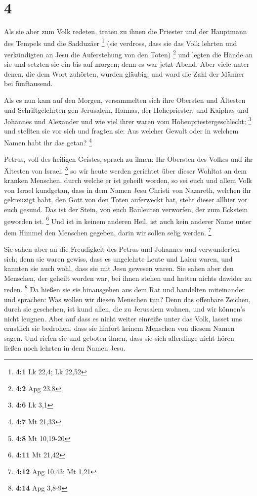 \hypertarget{section-1}{%
\section{4}\label{section-1}}

 Als sie aber zum Volk redeten, traten zu ihnen die
Priester und der Hauptmann des Tempels und die Sadduzäer \footnote{\textbf{4:1}
  Lk 22,4; Lk 22,52}  (sie verdross, dass sie das Volk
lehrten und verkündigten an Jesu die Auferstehung von den Toten)
\footnote{\textbf{4:2} Apg 23,8}  und legten die Hände an
sie und setzten sie ein bis auf morgen; denn es war jetzt Abend.
 Aber viele unter denen, die dem Wort zuhörten, wurden
gläubig; und ward die Zahl der Männer bei fünftausend.

 Als es nun kam auf den Morgen, versammelten sich ihre
Obersten und Ältesten und Schriftgelehrten gen Jerusalem, 
Hannas, der Hohepriester, und Kaiphas und Johannes und Alexander und wie
viel ihrer waren vom Hohenpriestergeschlecht; \footnote{\textbf{4:6} Lk
  3,1}  und stellten sie vor sich und fragten sie: Aus
welcher Gewalt oder in welchem Namen habt ihr das getan? \footnote{\textbf{4:7}
  Mt 21,33}

 Petrus, voll des heiligen Geistes, sprach zu ihnen: Ihr
Obersten des Volkes und ihr Ältesten von Israel, \footnote{\textbf{4:8}
  Mt 10,19-20}  so wir heute werden gerichtet über dieser
Wohltat an dem kranken Menschen, durch welche er ist geheilt worden,
 so sei euch und allem Volk von Israel kundgetan, dass in
dem Namen Jesu Christi von Nazareth, welchen ihr gekreuzigt habt, den
Gott von den Toten auferweckt hat, steht dieser allhier vor euch gesund.
 Das ist der Stein, von euch Bauleuten verworfen, der zum
Eckstein geworden ist. \footnote{\textbf{4:11} Mt 21,42} 
Und ist in keinem anderen Heil, ist auch kein anderer Name unter dem
Himmel den Menschen gegeben, darin wir sollen selig werden. \footnote{\textbf{4:12}
  Apg 10,43; Mt 1,21}

 Sie sahen aber an die Freudigkeit des Petrus und
Johannes und verwunderten sich; denn sie waren gewiss, dass es
ungelehrte Leute und Laien waren, und kannten sie auch wohl, dass sie
mit Jesu gewesen waren.  Sie sahen aber den Menschen, der
geheilt worden war, bei ihnen stehen und hatten nichts dawider zu reden.
\footnote{\textbf{4:14} Apg 3,8-9}  Da hießen sie sie
hinausgehen aus dem Rat und handelten miteinander und sprachen:
 Was wollen wir diesen Menschen tun? Denn das offenbare
Zeichen, durch sie geschehen, ist kund allen, die zu Jerusalem wohnen,
und wir können's nicht leugnen.  Aber auf dass es nicht
weiter einreiße unter das Volk, lasset uns ernstlich sie bedrohen, dass
sie hinfort keinem Menschen von diesem Namen sagen.  Und
riefen sie und geboten ihnen, dass sie sich allerdinge nicht hören
ließen noch lehrten in dem Namen Jesu.

